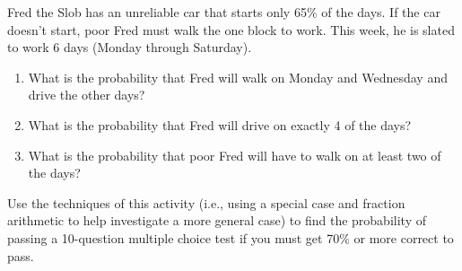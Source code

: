\begin{prob} 
Fred the Slob has an unreliable car that starts only 65\% of the days.
If the car doesn't start, poor Fred must walk the one block to work.
This week, he is slated to work 6 days (Monday through Saturday).  
\begin{enumerate}
\item What is the probability that Fred will walk on Monday and Wednesday
and drive the other days?
\item What is the probability that Fred will
drive on exactly 4 of the days? 
\item What is the probability that poor Fred will have to walk on at least two of the days?
\end{enumerate}
\end{prob}

\begin{prob}
Use the techniques of this activity (i.e., using a special case and
fraction arithmetic to help investigate a more general case) to find
the probability of passing a 10-question multiple choice test if you
must get 70\% or more correct to pass.
\end{prob}
